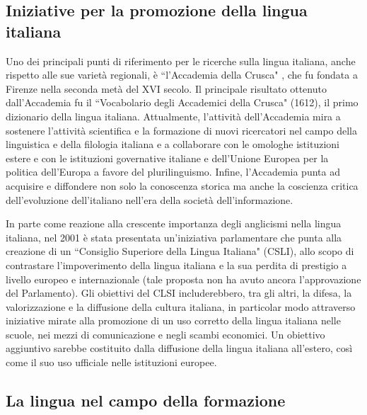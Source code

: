 \documentclass[]{../../metanetpaper}
\begin{document}
\begin{multicols}{2}
\subsection{Iniziative per la promozione della lingua italiana}

Uno dei principali punti di riferimento per le ricerche sulla lingua italiana,
anche rispetto alle sue variet\`{a} regionali, \`{e} “l'Accademia della
Crusca" \cite{Crusca}, che fu fondata a Firenze nella seconda met\`{a} del XVI
secolo. Il principale risultato ottenuto dall'Accademia fu il “Vocabolario
degli Accademici della Crusca" (1612), il primo dizionario della lingua
italiana. Attualmente, l'attivit\`{a} dell'Accademia mira a sostenere
l'attivit\`{a} scientifica e la formazione di nuovi ricercatori nel campo
della linguistica e della filologia italiana e a collaborare con le omologhe
istituzioni estere e con le istituzioni governative italiane e dell'Unione
Europea per la politica dell'Europa a favore del plurilinguismo. Infine, l'Accademia
punta ad acquisire e diffondere non solo la conoscenza storica ma anche la
coscienza critica dell'evoluzione dell'italiano nell'era della societ\`{a}
dell'informazione.



In parte come reazione alla crescente importanza degli anglicismi nella lingua
italiana, nel 2001 \`{e} stata presentata un'iniziativa parlamentare che punta
alla creazione di un “Consiglio Superiore della Lingua Italiana" (CSLI), allo
scopo di contrastare l'impoverimento della lingua italiana e la sua perdita di
prestigio a livello europeo e internazionale (tale proposta non ha avuto
ancora l'approvazione del Parlamento). Gli obiettivi del CLSI includerebbero,
tra gli altri, la difesa, la valorizzazione e la diffusione della cultura
italiana, in particolar modo attraverso iniziative mirate alla promozione di
un uso corretto della lingua italiana nelle scuole, nei mezzi di comunicazione
e negli scambi economici. Un obiettivo aggiuntivo sarebbe costituito dalla
diffusione della lingua italiana all'estero, cos\`{i} come il suo uso
ufficiale nelle istituzioni europee.

\subsection{La lingua nel campo della formazione}


\end{multicols}
\end{document}
